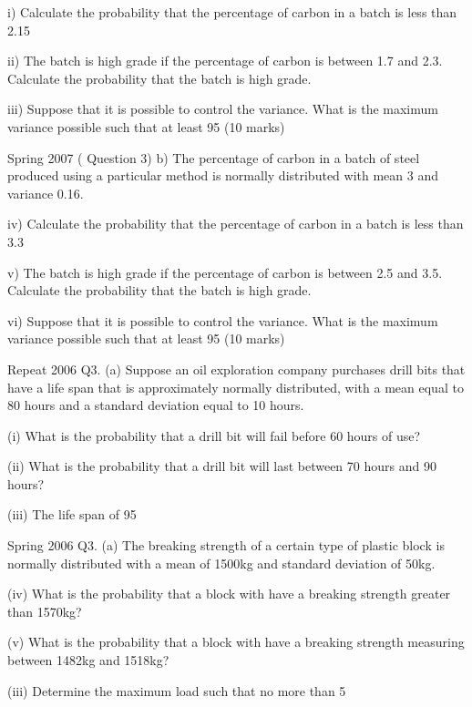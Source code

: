 \documentclass[a4]{beamer}
\begin{document}
i)	Calculate the probability that the percentage of carbon in a batch is less than 2.15

ii)	The batch is high grade if the percentage of carbon is between 1.7 and 2.3. Calculate the probability that the batch is high grade. 

iii)	Suppose that it is possible to control the variance. What is the maximum variance possible such that at least 95%
(10 marks)

Spring 2007 ( Question 3)
b) The percentage of carbon in a batch of steel produced using a particular method is normally distributed with mean 3 and variance 0.16. 

iv)	Calculate the probability that the percentage of carbon in a batch is less than 3.3

v)	The batch is high grade if the percentage of carbon is between 2.5 and 3.5. Calculate the probability that the batch is high grade. 



vi)	Suppose that it is possible to control the variance. What is the maximum variance possible such that at least 95%
(10 marks)

Repeat 2006
	Q3.    (a) 	Suppose an oil exploration company purchases drill bits that have a life span that is approximately normally distributed, with a mean equal to 80 hours and a standard deviation equal to 10 hours.

(i)	What is the probability that a drill bit will fail before 60 hours of use?

(ii)	What is the probability that a drill bit will last between 70 hours and 90 hours?

(iii)	The life span of 95%


Spring 2006
Q3.    (a)	The breaking strength of a certain type of plastic block is normally distributed with a
mean of 1500kg and standard deviation of 50kg. 

(iv)	What is the probability that a block with have a breaking strength greater than 1570kg?

(v)	What is the probability that a block with have a breaking strength measuring between 1482kg and 1518kg?

(iii)	Determine the maximum load such that no more than 5%
\end{document}
